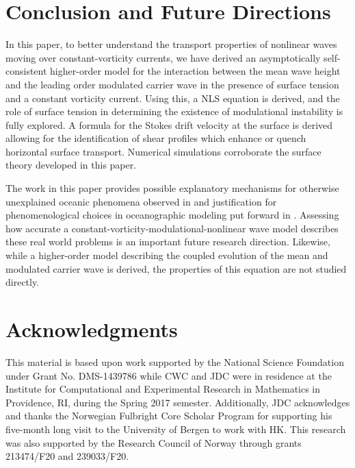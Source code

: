 \documentclass{JFM_Style/jfm}
\begin{document}
\section{Conclusion and Future Directions}

In this paper, to better understand the transport properties of nonlinear waves moving over constant-vorticity currents, we have derived an asymptotically self-consistent higher-order model for the interaction between the mean wave height and the leading order modulated carrier wave in the presence of surface tension and a constant vorticity current.  Using this, a NLS equation is derived, and the role of surface tension in determining the existence of modulational instability is fully explored.  A formula for the Stokes drift velocity at the surface is derived allowing for the identification of shear profiles which enhance or quench horizontal surface transport.  Numerical simulations corroborate the surface theory developed in this paper.

The work in this paper provides possible explanatory mechanisms for otherwise unexplained oceanic phenomena observed 
in \cite{smith} and justification for phenomenological choices in oceanographic modeling put forward in \cite{breivik}.  Assessing how accurate a constant-vorticity-modulational-nonlinear wave model describes these real world problems is an important future research direction.  Likewise, while a higher-order model describing the coupled evolution of the mean and modulated carrier wave is derived, the properties of this equation are not studied directly.  

\section{Acknowledgments}
This material is based upon work supported by the National Science Foundation under Grant No. DMS-1439786 while CWC and JDC were in residence at the Institute for Computational and Experimental Research in Mathematics in Providence, RI, during the Spring 2017 semester.  Additionally, JDC acknowledges and thanks the Norwegian Fulbright Core Scholar Program for supporting his five-month long visit to the University of Bergen to work with HK. This research was also supported by
the Research Council of Norway through grants 213474/F20 and 239033/F20.



\end{document}
